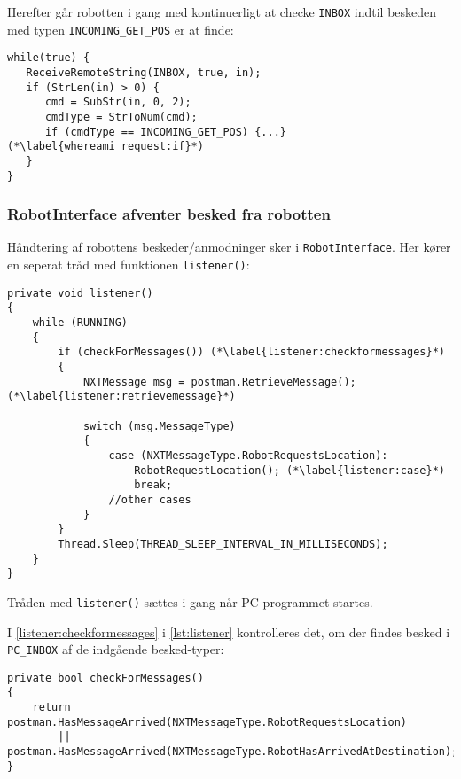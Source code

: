 Herefter går robotten i gang med kontinuerligt at checke \lstinline[style=c]!INBOX! indtil beskeden med typen \lstinline[style=c]!INCOMING_GET_POS! er at finde:

\begin{lstlisting}[style=csmall,label=lst:whereami_response,caption=Robotten venter på svar.]
while(true) {
   ReceiveRemoteString(INBOX, true, in);
   if (StrLen(in) > 0) {
      cmd = SubStr(in, 0, 2);
      cmdType = StrToNum(cmd);
      if (cmdType == INCOMING_GET_POS) {...} (*\label{whereami_request:if}*)
   }
}
\end{lstlisting}

\subsubsection{RobotInterface afventer besked fra robotten}
Håndtering af robottens beskeder/anmodninger sker i \lstinline[style=csharp]!RobotInterface!.
Her kører en seperat tråd med funktionen \lstinline[style=csharp]!listener()!:
\begin{lstlisting}[style=csharpsmall,label=lst:listener,caption=listener() i RobotInterface.]
private void listener()
{
    while (RUNNING)
    {
        if (checkForMessages()) (*\label{listener:checkformessages}*)
        {
            NXTMessage msg = postman.RetrieveMessage(); (*\label{listener:retrievemessage}*)

            switch (msg.MessageType)
            {
                case (NXTMessageType.RobotRequestsLocation):
                    RobotRequestLocation(); (*\label{listener:case}*)
                    break;
                //other cases
            }
        }
        Thread.Sleep(THREAD_SLEEP_INTERVAL_IN_MILLISECONDS);
    }
}
\end{lstlisting}

Tråden med \lstinline[style=csharp]!listener()! sættes i gang når PC programmet startes.

I \cref{listener:checkformessages} i \cref{lst:listener} kontrolleres det, om der findes besked i \lstinline[style=csharp]!PC_INBOX! af de indgående besked-typer:

\begin{lstlisting}[style=csharpsmall,label=lst:checkformessages,caption=checkForMessages() i RobotInterface.]
private bool checkForMessages()
{
    return postman.HasMessageArrived(NXTMessageType.RobotRequestsLocation)
        || postman.HasMessageArrived(NXTMessageType.RobotHasArrivedAtDestination);
}
\end{lstlisting}

